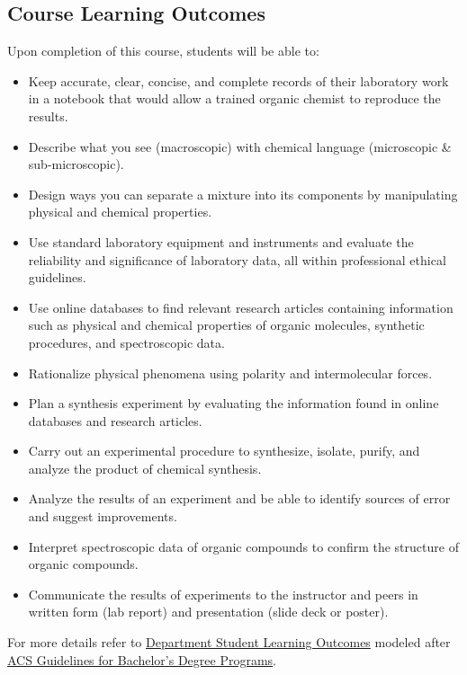 \subsection{Course Learning Outcomes}\label{course-learning-outcomes}

Upon completion of this course, students will be able to:

\begin{itemize}
\tightlist
\item
  Keep accurate, clear, concise, and complete records of their
  laboratory work in a notebook that would allow a trained organic
  chemist to reproduce the results.
\item
  Describe what you see (macroscopic) with chemical language
  (microscopic \& sub-microscopic).
\item
  Design ways you can separate a mixture into its components by
  manipulating physical and chemical properties.
\item
  Use standard laboratory equipment and instruments and evaluate the
  reliability and significance of laboratory data, all within
  professional ethical guidelines.
\item
  Use online databases to find relevant research articles containing
  information such as physical and chemical properties of organic
  molecules, synthetic procedures, and spectroscopic data.
\item
  Rationalize physical phenomena using polarity and intermolecular
  forces.
\item
  Plan a synthesis experiment by evaluating the information found in
  online databases and research articles.
\item
  Carry out an experimental procedure to synthesize, isolate, purify,
  and analyze the product of chemical synthesis.
\item
  Analyze the results of an experiment and be able to identify sources
  of error and suggest improvements.
\item
  Interpret spectroscopic data of organic compounds to confirm the
  structure of organic compounds.
\item
  Communicate the results of experiments to the instructor and peers in
  written form (lab report) and presentation (slide deck or poster).
\end{itemize}

For more details refer to \href{/a5Vq_rZQRI2_f6ylivvNiA}{Department
Student Learning Outcomes} modeled after
\href{https://www.acs.org/education/policies/acs-approval-program/guidelines.html}{ACS
Guidelines for Bachelor's Degree Programs}.

